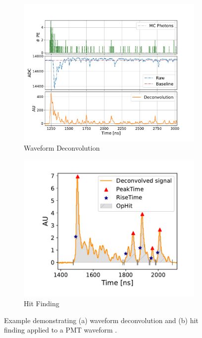 \begin{figure}[hb!]
        \centering
        \begin{subfigure}[b]{0.59\textwidth}
            \centering
            \includegraphics[width=\textwidth]{pds_reco_deconvolution}
            \caption{Waveform Deconvolution}
            \label{fig:pds_reco_deconvolution}
        \end{subfigure}
        \hfill
        \begin{subfigure}[b]{0.4\textwidth}  
            \centering 
            \includegraphics[width=\textwidth]{pds_reco_hit_finding}
            \caption{Hit Finding}
            \label{fig:pds_reco_hit_finding}
        \end{subfigure}
        \caption[Waveform Deconvolution and Hit Finding on PMT Waveforms]{
	Example demonstrating (a) waveform deconvolution and (b) hit finding applied to a PMT waveform \cite{sbnd_pds_paper}.
	}
        \label{fig:pds_reco}
\end{figure}



